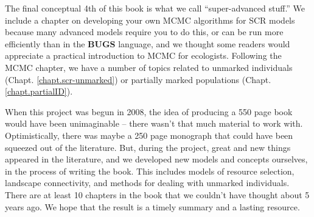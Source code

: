 The final conceptual 4th of this book is what we call
``super-advanced stuff.''%
We include a
chapter on developing your own MCMC algorithms for SCR models because
many advanced models require you to do this, or can be run more efficiently than in the {\bf BUGS} language, and we thought some
readers would appreciate a practical introduction to MCMC for ecologists.
Following the MCMC chapter, we have a number
of topics related to unmarked individuals 
(Chapt. \ref{chapt.scr-unmarked}) or partially marked populations
(Chapt. \ref{chapt.partialID}).

When this project was begun in 2008, the idea of producing a 550 page
book would have been unimaginable -- there wasn't that much material
to work with.  Optimistically, there was maybe a 250 page monograph that
could have been squeezed out of the literature.  But, during the project,
great and new things appeared in the literature, and we developed new
models and concepts ourselves, in the process of writing the book. This includes models of resource selection,
landscape connectivity, and methods for dealing with unmarked
individuals. There are at least 10 chapters in the book that we
couldn't have thought about 5 years ago. We hope that the result is a
timely summary and a lasting resource.



